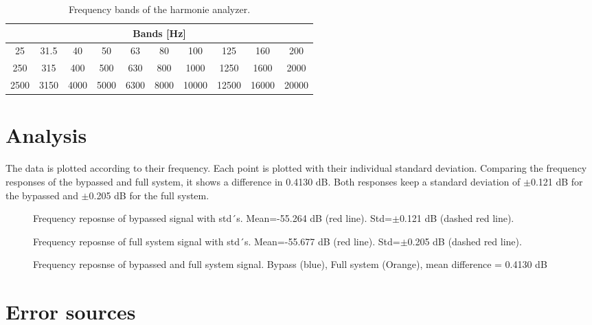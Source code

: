 \begin{table}[H]
\centering
\begin{tabular}{|c|c|c|c|c|c|c|c|c|c|}
\hline
\multicolumn{10}{|c|}{Bands [Hz]}                                       \\ \hline
25   & 31.5 & 40   & 50   & 63   & 80   & 100   & 125   & 160   & 200   \\ \hline
250  & 315  & 400  & 500  & 630  & 800  & 1000  & 1250  & 1600  & 2000  \\ \hline
2500 & 3150 & 4000 & 5000 & 6300 & 8000 & 10000 & 12500 & 16000 & 20000 \\ \hline
\end{tabular}
\caption{Frequency bands of the harmonie analyzer.}
\label{tb:freqBands2}
\end{table}

\section{Analysis}
The data is plotted according to their frequency. Each point is plotted with their individual standard deviation. Comparing the frequency responses of the bypassed and full system, it shows a difference in 0.4130 dB. Both responses keep a standard deviation of $\pm$0.121 dB for the bypassed and $\pm$0.205 dB for the full system.
\begin{figure}[H]
	\centering
	
	\caption{Frequency reposnse of bypassed signal with std´s. Mean=-55.264 dB (red line). Std=$\pm$0.121 dB (dashed red line).}
	\label{fig:FreqRespBypass}
\end{figure}

\begin{figure}[H]
	\centering
	
	\caption{Frequency reposnse of full system signal with std´s. Mean=-55.677 dB (red line). Std=$\pm$0.205 dB (dashed red line).}
	\label{fig:FreqRespSystem}
\end{figure}

\begin{figure}[H]
	\centering
	
	\caption{Frequency reposnse of bypassed and full system signal. Bypass (blue), Full system (Orange), mean difference = 0.4130 dB}
	\label{fig:FreqRespComp}
\end{figure}



\section{Error sources}

